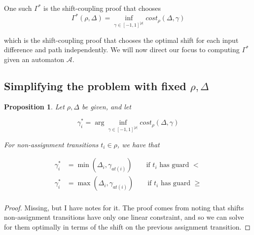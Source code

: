 \documentclass{article}
\newtheorem{proposition}{Proposition}[section]
\newtheorem{corollary}{Corollary}[theorem]
\renewcommand{\epsilon}{\varepsilon}
\newcommand{\1}{\langle 1 \rangle}
\newcommand{\2}{\langle 2 \rangle}
\begin{document}
One such $\Gamma^*$ is the shift-coupling proof that chooses \[\Gamma^*(\rho, \Delta) = \inf_{\gamma \in [-1, 1]^{|\rho|}} cost_{\rho} (\Delta, \gamma)\]

which is the shift-coupling proof that chooses the optimal shift for each input difference and path independently. We will now direct our focus to computing $\Gamma^*$ given an automaton $\mathcal{A}$.

\subsection{Simplifying the problem with fixed $\rho, \Delta$}

\begin{proposition}
    \label{prop:gammas_non_assignment}
    Let $\rho, \Delta$ be given, and let 
    
    \[\gamma_i^* = \arg \inf_{\gamma \in [-1, 1]^{|\rho|}} cost_{\rho} (\Delta, \gamma)\]
    
    For non-assignment transitions $t_i \in \rho$, we have that 

    \begin{align*}
        \gamma_i^* &= \min(\Delta_i, \gamma_{at(i)}) \qquad \text{if } t_i \text{ has guard } < \\
        \gamma_i^* &= \max(\Delta_i, \gamma_{at(i)}) \qquad \text{if } t_i \text{ has guard } \geq \\
    \end{align*}
\end{proposition}

\begin{proof}
    Missing, but I have notes for it. The proof comes from noting that shifts non-assignment transitions have only one linear constraint, and so we can solve for them optimally in terms of the shift on the previous assignment transition. 
\end{proof}


\end{document}
